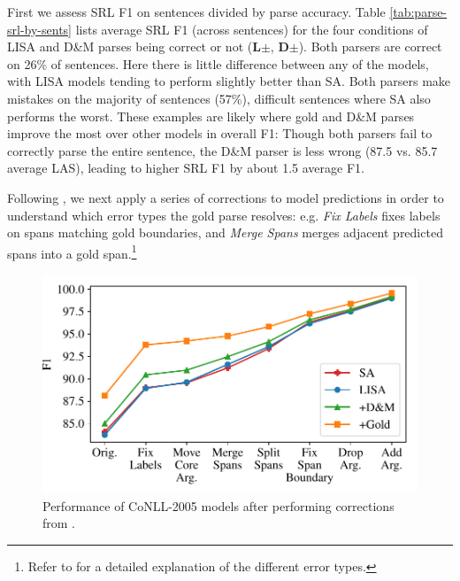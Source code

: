\documentclass[11pt,a4paper]{article}
\begin{document}
First we assess SRL F1 on sentences divided by parse accuracy. Table \ref{tab:parse-srl-by-sents} lists average SRL F1 (across sentences) for the four conditions of LISA and D\&M parses being correct or not ({\bf L$\pm$}, {\bf D$\pm$}). Both parsers are correct on 26\% of sentences. Here there is little difference between any of the models, with LISA models tending to perform slightly better than SA. Both parsers make mistakes on the majority of sentences (57\%), difficult sentences where SA also performs the worst. These examples are likely where gold and D\&M parses improve the most over other models in overall F1: Though both parsers fail to correctly parse the entire sentence, the D\&M parser is less wrong (87.5 vs. 85.7 average LAS), leading to higher SRL F1 by about 1.5 average F1.

Following \citet{he2017deep}, we next apply a series of corrections to model predictions in order to understand which error types the gold parse resolves: e.g. \emph{Fix Labels} fixes labels on spans matching gold boundaries, and \emph{Merge Spans} merges adjacent predicted spans into a gold span.\footnote{Refer to \citet{he2017deep} for a detailed explanation of the different error types.}

\begin{figure}
\includegraphics[scale=0.52]{errors.pdf}
\caption{Performance of CoNLL-2005 models after performing corrections from \citet{he2017deep}. \label{errors-fig}}
\end{figure}
\end{document}
